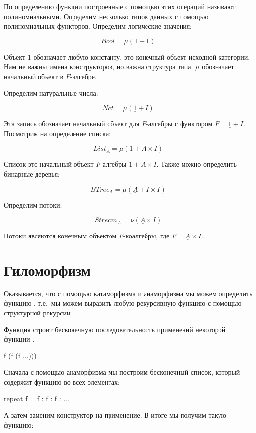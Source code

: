 По определению функции построенные с помощью этих операций
называют полиномиальными. 
Определим несколько типов данных с помощью полиномиальных
функторов. Определим логические значения:

\[ Bool = \mu(\underline{1} + \underline{1}) \]

Объект $1$ обозначает любую константу, это конечный объект
исходной категории. Нам не важны имена конструкторов,
но важна структура типа. $\mu$ обозначает начальный объект
в $F$-алгебре. 

Определим натуральные числа:

\[ Nat = \mu(\underline{1} + I) \]

Эта запись обозначает начальный объект для $F$-алгебры
с функтором $F=\underline{1}+I$. 
Посмотрим на определение списка:

\[ List_A = \mu(\underline{1} + \underline{A} \times I) \]

Список это начальный объект $F$-алгебры 
$\underline{1}+\underline{A}\times I$. 
Также можно определить бинарные деревья:

\[ BTree_A = \mu(\underline{A} + I \times I )\]

Определим потоки:

\[ Stream_A = \nu (\underline{A} \times I) \]

Потоки являются конечным объектом $F$-коалгебры, 
где $F= \underline{A} \times I$.

\section{Гиломорфизм}

Оказывается, что с помощью катаморфизма и анаморфизма
мы можем определить функцию , т.е.~мы можем
выразить любую рекурсивную функцию с помощью структурной
рекурсии. 

Функция  строит бесконечную последовательность
применений некоторой функции . 

\begin{code}
f (f (f ...)))
\end{code}

Сначала с помощью анаморфизма мы построим бесконечный список, 
который содержит функцию  во всех элементах:

\begin{code}
repeat f = f : f : f : ...
\end{code}

А затем заменим конструктор \In{:} на применение.
В итоге мы получим такую функцию:


